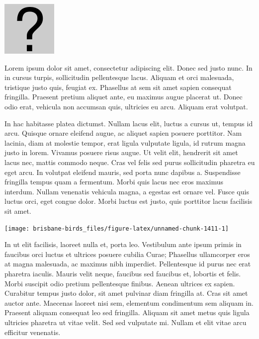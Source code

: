 \documentclass[]{book}
\let\origfigure\figure
\let\endorigfigure\endfigure
\renewenvironment{figure}[1][2] {
  \expandafter\origfigure\expandafter[H]
} {
  \endorigfigure
}
\begin{document}
\begin{figure}
\centering
\includegraphics{assets/missing.png}
\caption{No image for species}
\end{figure}

Lorem ipsum dolor sit amet, consectetur adipiscing elit. Donec sed justo
nunc. In in cursus turpis, sollicitudin pellentesque lacus. Aliquam et
orci malesuada, tristique justo quis, feugiat ex. Phasellus at sem sit
amet sapien consequat fringilla. Praesent pretium aliquet ante, eu
maximus augue placerat ut. Donec odio erat, vehicula non accumsan quis,
ultricies eu arcu. Aliquam erat volutpat.

In hac habitasse platea dictumst. Nullam lacus elit, luctus a cursus ut,
tempus id arcu. Quisque ornare eleifend augue, ac aliquet sapien posuere
porttitor. Nam lacinia, diam at molestie tempor, erat ligula vulputate
ligula, id rutrum magna justo in lorem. Vivamus posuere risus augue. Ut
velit elit, hendrerit sit amet lacus nec, mattis commodo neque. Cras vel
felis sed purus sollicitudin pharetra eu eget arcu. In volutpat eleifend
mauris, sed porta nunc dapibus a. Suspendisse fringilla tempus quam a
fermentum. Morbi quis lacus nec eros maximus interdum. Nullam venenatis
vehicula magna, a egestas est ornare vel. Fusce quis luctus orci, eget
congue dolor. Morbi luctus est justo, quis porttitor lacus facilisis sit
amet.

\begin{figure}
\texttt{[image: brisbane-birds\_files/figure-latex/unnamed-chunk-1411-1]} \caption{insert figure caption}\label{fig:unnamed-chunk-1411}
\end{figure}

In ut elit facilisis, laoreet nulla et, porta leo. Vestibulum ante ipsum
primis in faucibus orci luctus et ultrices posuere cubilia Curae;
Phasellus ullamcorper eros at magna malesuada, ac maximus nibh
imperdiet. Pellentesque id purus nec erat pharetra iaculis. Mauris velit
neque, faucibus sed faucibus et, lobortis et felis. Morbi suscipit odio
pretium pellentesque finibus. Aenean ultrices ex sapien. Curabitur
tempus justo dolor, sit amet pulvinar diam fringilla at. Cras sit amet
auctor ante. Maecenas laoreet nisi sem, elementum condimentum sem
aliquam in. Praesent aliquam consequat leo sed fringilla. Aliquam sit
amet metus quis ligula ultricies pharetra ut vitae velit. Sed sed
vulputate mi. Nullam et elit vitae arcu efficitur venenatis.
\end{document}
